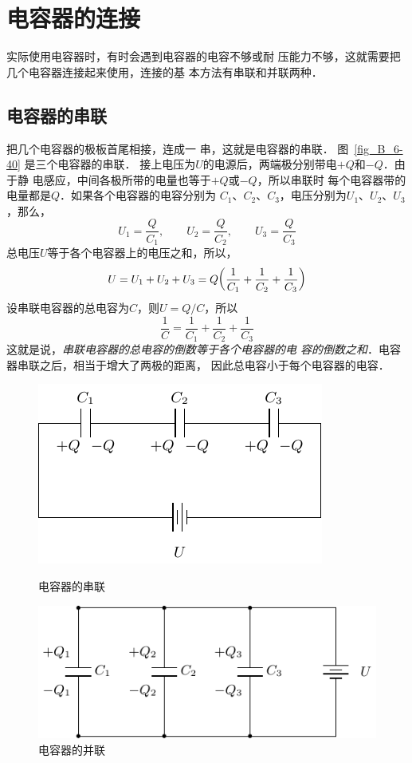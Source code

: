 \section{电容器的连接}
实际使用电容器时，有时会遇到电容器的电容不够或耐
压能力不够，这就需要把几个电容器连接起来使用，连接的基
本方法有串联和并联两种．
\subsection{电容器的串联}

把几个电容器的极板首尾相接，连成一
串，这就是电容器的串联．
图~\ref{fig_B_6-40} 是三个电容器的串联．
接上电压为$U$的电源后，两端极分别带电$+Q$和$-Q$．由于静
电感应，中间各极所带的电量也等于$+Q$或$-Q$，所以串联时
每个电容器带的电量都是$Q$．如果各个电容器的电容分别为
$C_1$、$C_2$、$C_3$，电压分别为$U_1$、$U_2$、$U_3$，那么，
\[ U_1=\frac{Q}{C_1},\qquad U_2=\frac{Q}{C_2},\qquad U_3=\frac{Q}{C_3}\]
总电压$U$等于各个电容器上的电压之和，所以，
\[U=U_1+U_2+U_3=Q\qty(\frac{1}{C_1}+\frac{1}{C_2}+\frac{1}{C_3})\]
设串联电容器的总电容为$C$，则$U=Q/C$，所以
\[\frac{1}{C}=\frac{1}{C_1}+\frac{1}{C_2}+\frac{1}{C_3}\]
这就是说，\textit{串联电容器的总电容的倒数等于各个电容器的电
容的倒数之和}．电容器串联之后，相当于增大了两极的距离，
因此总电容小于每个电容器的电容．

\begin{figure}[htbp]
    \centering
    \begin{minipage}[t]{0.45\linewidth}
    	\centering
    	\includegraphics{fig/B/6-40.pdf}
    	\caption{电容器的串联}\label{fig_B_6-40}
    \end{minipage}
    \hfil
    \begin{minipage}[t]{0.45\linewidth}
    	\centering
    	\includegraphics{fig/B/6-41.pdf}
    	\caption{电容器的并联}\label{fig_B_6-41}
    \end{minipage}
\end{figure}



